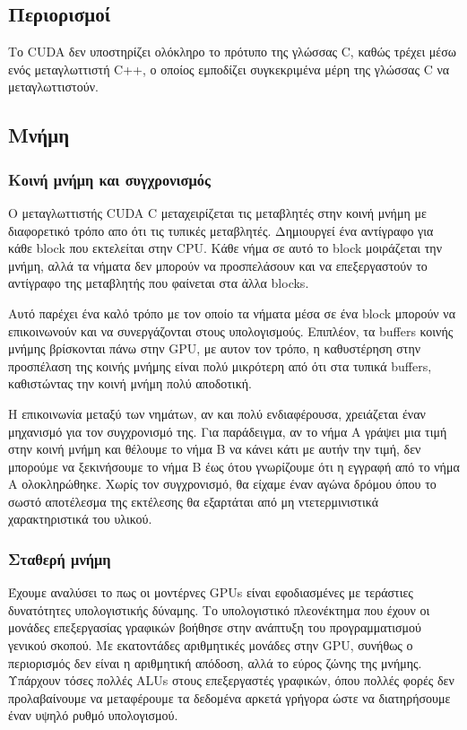 \subsection{Περιορισμοί}
 Το CUDA δεν υποστηρίζει ολόκληρο το πρότυπο της γλώσσας C, καθώς τρέχει μέσω ενός μεταγλωττιστή C++, ο οποίος εμποδίζει συγκεκριμένα μέρη της γλώσσας C να μεταγλωττιστούν.

\subsection{Μνήμη}
\subsubsection{Κοινή μνήμη και συγχρονισμός}
Ο μεταγλωττιστής CUDA C μεταχειρίζεται τις μεταβλητές στην κοινή μνήμη με διαφορετικό τρόπο απο ότι τις τυπικές μεταβλητές. Δημιουργεί ένα αντίγραφο για κάθε block που εκτελείται στην CPU. Κάθε νήμα σε αυτό το block μοιράζεται την μνήμη, αλλά τα νήματα δεν μπορούν να προσπελάσουν και να επεξεργαστούν το αντίγραφο της μεταβλητής που φαίνεται στα άλλα blocks.

Αυτό παρέχει ένα καλό τρόπο με τον οποίο τα νήματα μέσα σε ένα block μπορούν να επικοινωνούν και να συνεργάζονται στους υπολογισμούς. Επιπλέον, τα buffers κοινής μνήμης βρίσκονται πάνω στην GPU, με αυτον τον τρόπο, η καθυστέρηση στην προσπέλαση της κοινής μνήμης είναι πολύ μικρότερη από ότι στα τυπικά buffers, καθιστώντας την κοινή μνήμη πολύ αποδοτική.

Η επικοινωνία μεταξύ των νημάτων, αν και πολύ ενδιαφέρουσα, χρειάζεται έναν μηχανισμό για τον συγχρονισμό της. Για παράδειγμα, αν το νήμα Α γράψει μια τιμή στην κοινή μνήμη και θέλουμε το νήμα Β να κάνει κάτι με αυτήν την τιμή, δεν μπορούμε να ξεκινήσουμε το νήμα Β έως ότου γνωρίζουμε ότι η εγγραφή από το νήμα Α ολοκληρώθηκε. Χωρίς τον συγχρονισμό, θα είχαμε έναν αγώνα δρόμου όπου το σωστό αποτέλεσμα της εκτέλεσης θα εξαρτάται από μη ντετερμινιστικά χαρακτηριστικά του υλικού.
\subsubsection{Σταθερή μνήμη}
Έχουμε αναλύσει το πως οι μοντέρνες GPUs είναι εφοδιασμένες με τεράστιες δυνατότητες υπολογιστικής δύναμης. Το υπολογιστικό πλεονέκτημα που έχουν οι μονάδες επεξεργασίας γραφικών βοήθησε στην ανάπτυξη του προγραμματισμού γενικού σκοπού. Με εκατοντάδες αριθμητικές μονάδες στην GPU, συνήθως ο περιορισμός δεν είναι η αριθμητική απόδοση, αλλά το εύρος ζώνης της μνήμης. Υπάρχουν τόσες πολλές ALUs στους επεξεργαστές γραφικών, όπου πολλές φορές δεν προλαβαίνουμε να μεταφέρουμε τα δεδομένα αρκετά γρήγορα ώστε να διατηρήσουμε έναν υψηλό ρυθμό υπολογισμού. 

